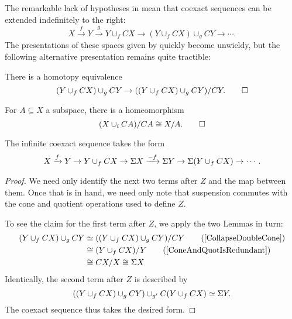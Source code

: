 The remarkable lack of hypotheses in  mean that coexact sequences can be extended indefinitely to the right: \[X \xrightarrow f Y \xrightarrow g Y \cup_f CX \to (Y \cup_f CX) \cup_g CY \to \cdots.\]
The presentations of these spaces given by  quickly become unwieldy, but the following alternative presentation remains quite tractible:

\begin{lemma}\label{CollapseDoubleCone}
There is a homotopy equivalence \[(Y \cup_f CX) \cup_g CY \to ((Y \cup_f CX) \cup_g CY) / CY. \qed\]
\end{lemma}

\begin{lemma}\label{ConeAndQuotIsRedundant}
For $A \subseteq X$ a subspace, there is a homeomorphism \[(X \cup_i CA) / CA \cong X / A. \qed\]
\end{lemma}

\begin{corollary}
The infinite coexact sequence takes the form \[X \xrightarrow f Y \to Y \cup_f CX \to \Sigma X \xrightarrow{-f} \Sigma Y \to \Sigma(Y \cup_f CX) \to \cdots.\]
\end{corollary}
\begin{proof}
We need only identify the next two terms after $Z$ and the map between them.
Once that is in hand, we need only note that suspension commutes with the cone and quotient operations used to define $Z$.

To see the claim for the first term after $Z$, we apply the two Lemmas in turn:
\begin{align*}
(Y \cup_f CX) \cup_g CY & \simeq ((Y \cup_f CX) \cup_g CY) / CY \tag{\Cref{CollapseDoubleCone}} \\
& \cong (Y \cup_f CX) / Y \tag{\Cref{ConeAndQuotIsRedundant}} \\
& \cong CX/X \cong \Susp X
\end{align*}
Identically, the second term after $Z$ is described by \[((Y \cup_f CX) \cup_g CY) \cup_{g'} C(Y \cup_f CX) \simeq \Sigma Y.\]
The coexact sequence thus takes the desired form.
\end{proof}

